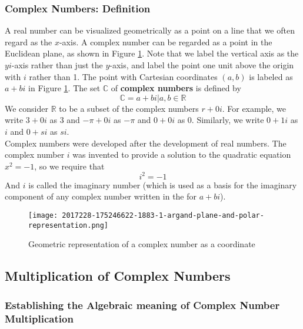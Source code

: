\documentclass{article}
\begin{document}
\subsubsection{Complex Numbers: Definition}\cite[p.$\Tilde{12}$]{Fraleigh2003} 

A real number can be visualized geometrically as a point on a line that we often regard as the \(x\)-axis. A complex number can be regarded as a point in the Euclidean plane, as shown in Figure \ref{fig:complex-num-point}. Note that we label the vertical axis as the \(yi\)-axis rather than just the \(y\)-axis, and label the point one unit above the origin with \(i\) rather than 1. The point with Cartesian coordinates \((a,b)\) is labeled as \(a + bi\) in Figure \ref{fig:complex-num-point}. The set $\mathds{C}$ of \textbf{complex numbers} is defined by \[\mathds{C} = a + bi | a,b \in \mathds{R}\] We consider $\mathds{R}$ to be a subset of the complex numbers \(r + 0i\). For example, we write \(3 + 0i\) as \(3\) and \(-\pi + 0i\) as \(-\pi\) and \(0 + 0i\) as \(0\). Similarly, we write \(0 + 1i\) as \(i\) and \(0 + si\) as \(si\).  \\ Complex numbers were developed after the development of real numbers. The complex number \(i\) was invented to provide a solution to the quadratic equation \(x^2 = -1\), so we require that \[i^2 = -1\] And \(i\) is called the imaginary number (which is used as a basis for the imaginary component of any complex number written in the for \(a + bi\)).   

\begin{figure}[H] 
    \centering
    \texttt{[image: 2017228-175246622-1883-1-argand-plane-and-polar-representation.png]}
    \caption{Geometric representation of a complex number as a coordinate}
    \label{fig:complex-num-point} 
\end{figure}



\subsection{Multiplication of Complex Numbers}  

\subsubsection{Establishing the Algebraic meaning of Complex Number Multiplication}\cite[p.$\Tilde{12-13}$]{Fraleigh2003}
\end{document}
